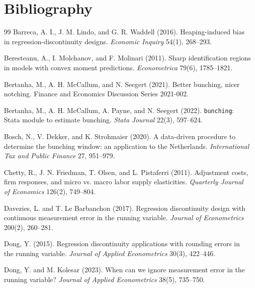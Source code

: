 \documentclass[11pt]{article}
\theoremstyle{definition}
\theoremstyle{plain}
\theoremstyle{remark}
\begin{document}
\section*{Bibliography}
\begin{thebibliography}{99}
Barreca, A. I., J. M. Lindo, and G. R. Waddell (2016).
Heaping-induced bias in regression-discontinuity designs.
\emph{Economic Inquiry} 54(1), 268--293.

Beresteanu, A., I. Molchanov, and F. Molinari (2011).
Sharp identification regions in models with convex moment predictions.
\emph{Econometrica} 79(6), 1785--1821.

Bertanha, M., A. H. McCallum, and N. Seegert (2021).
Better bunching, nicer notching.
Finance and Economics Discussion Series 2021-002.

Bertanha, M., A. H. McCallum, A. Payne, and N. Seegert (2022).
\texttt{bunching}: Stata module to estimate bunching.
\emph{Stata Journal} 22(3), 597--624.

Bosch, N., V. Dekker, and K. Strohmaier (2020).
A data-driven procedure to determine the bunching window: an application to the Netherlands.
\emph{International Tax and Public Finance} 27, 951--979.

Chetty, R., J. N. Friedman, T. Olsen, and L. Pistaferri (2011).
Adjustment costs, firm responses, and micro vs. macro labor supply elasticities.
\emph{Quarterly Journal of Economics} 126(2), 749--804.

Davezies, L. and T. Le Barbanchon (2017).
Regression discontinuity design with continuous measurement error in the running variable.
\emph{Journal of Econometrics} 200(2), 260--281.

Dong, Y. (2015).
Regression discontinuity applications with rounding errors in the running variable.
\emph{Journal of Applied Econometrics} 30(3), 422--446.

Dong, Y. and M. Kolesar (2023).
When can we ignore measurement error in the running variable?
\emph{Journal of Applied Econometrics} 38(5), 735--750.


\end{thebibliography}
\end{document}

